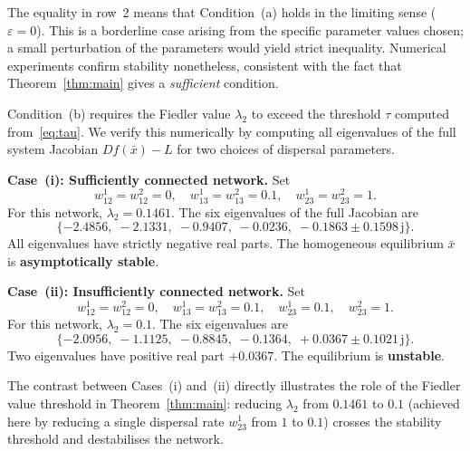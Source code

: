 \documentclass[12pt,a4paper]{article}
\theoremstyle{definition}
\begin{document}
The equality in row~2 means that Condition~(a) holds in the
limiting sense ($\varepsilon = 0$).
This is a borderline case arising from the specific parameter values
chosen; a small perturbation of the parameters would yield strict
inequality. Numerical experiments confirm stability nonetheless, consistent with
the fact that Theorem~\ref{thm:main} gives a \emph{sufficient} condition.




Condition~(b) requires the Fiedler value $\lambda_2$ to exceed the
threshold $\tau$ computed from~\eqref{eq:tau}.
We verify this numerically by computing all eigenvalues of the full
system Jacobian $Df(\bar{x}) - L$ for two choices of dispersal
parameters.

\medskip
\noindent\textbf{Case~(i): Sufficiently connected network.}
Set
\begin{equation*}
  w^1_{12} = w^2_{12} = 0,\quad
  w^1_{13} = w^2_{13} = 0.1,\quad
  w^1_{23} = w^2_{23} = 1.
  \label{eq:ex1_disp1}
\end{equation*}
For this network, $\lambda_2 = 0.1461$.
The six eigenvalues of the full Jacobian are
\begin{equation*}
  \{-2.4856,\;-2.1331,\;-0.9407,\;-0.0236,\;
    -0.1863 \pm 0.1598\,\mathrm{j}\}.
  \label{eq:ex1_eig1}
\end{equation*}
All eigenvalues have strictly negative real parts.
The homogeneous equilibrium $\bar{x}$ is \textbf{asymptotically
stable}.

\medskip
\noindent\textbf{Case~(ii): Insufficiently connected network.}
Set
\begin{equation*}
  w^1_{12} = w^2_{12} = 0,\quad
  w^1_{13} = w^2_{13} = 0.1,\quad
  w^1_{23} = 0.1,\quad w^2_{23} = 1.
  \label{eq:ex1_disp2}
\end{equation*}
For this network, $\lambda_2 = 0.1$.
The six eigenvalues are
\begin{equation*}
  \{-2.0956,\;-1.1125,\;-0.8845,\;-0.1364,\;
    +0.0367 \pm 0.1021\,\mathrm{j}\}.
  \label{eq:ex1_eig2}
\end{equation*}
Two eigenvalues have positive real part $+0.0367$.
The equilibrium is \textbf{unstable}.

\medskip
The contrast between Cases~(i) and~(ii) directly illustrates the role of the
Fiedler value threshold in Theorem~\ref{thm:main}: reducing
$\lambda_2$ from $0.1461$ to $0.1$ (achieved here by reducing a
single dispersal rate $w^1_{23}$ from $1$ to $0.1$) crosses the
stability threshold and destabilises the network.
\end{document}

